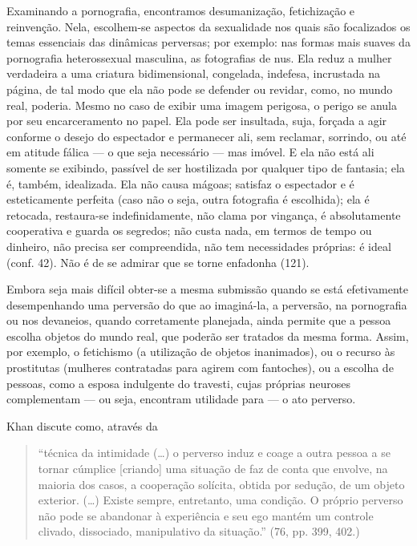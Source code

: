 Examinando a pornografia, encontramos desumanização,\idxpornodesu{} fetichização e
reinvenção. Nela, escolhem-se aspectos da sexualidade nos quais são
focalizados os temas essenciais das dinâmicas perversas; por exemplo:
nas formas mais suaves da pornografia heterossexual masculina, as
fotografias de nus. Ela reduz a mulher verdadeira a uma criatura
bidimensional, congelada, indefesa, incrustada na página, de tal modo
que ela não pode se defender ou revidar, como, no mundo real, poderia.
Mesmo no caso de exibir uma imagem perigosa, o perigo se anula por seu
encarceramento no papel. Ela pode ser insultada, suja, forçada a agir
conforme o desejo do espectador e permanecer ali, sem reclamar,
sorrindo, ou até em atitude fálica --- o que seja necessário --- mas
imóvel. E ela não está ali somente se exibindo, passível de ser
hostilizada por qualquer tipo de fantasia; ela é, também, idealizada.\idxpornoidea{}
Ela não causa mágoas; satisfaz o espectador e é esteticamente perfeita
(caso não o seja, outra fotografia é escolhida); ela é retocada,
restaura-se indefinidamente, não clama por vingança, é absolutamente
cooperativa e guarda os segredos; não custa nada, em termos de tempo ou
dinheiro, não precisa ser compreendida, não tem necessidades próprias:
é ideal (conf. 42). Não é de se admirar que se torne\idxpornoenfa{} enfadonha (121).

Embora seja mais difícil obter-se a mesma submissão quando se está
efetivamente desempenhando uma perversão do que ao imaginá-la, a
perversão, na pornografia ou nos devaneios, quando corretamente
planejada, ainda permite que a pessoa escolha objetos do mundo real,
que poderão ser tratados da mesma forma. Assim, por exemplo, o
fetichismo (a utilização de objetos inanimados), ou o recurso às
prostitutas\idxprost{} (mulheres contratadas para agirem com fantoches), ou a
escolha de pessoas, como a esposa\idxtravempape{} indulgente do travesti, cujas
próprias neuroses complementam --- ou seja, encontram utilidade para
--- o ato perverso.

Khan\idxkhan{} discute como, através da

\begin{quote}
  ``técnica\idxpervtecni{} da intimidade\idxintim{} (\ldots{}) o perverso induz e coage a
  outra pessoa a se tornar cúmplice [criando] uma situação de
  faz de conta que envolve, na maioria dos casos, a cooperação solícita,
  obtida por sedução, de um objeto exterior. (\ldots{}) Existe sempre,
  entretanto, uma condição. O próprio perverso não pode se abandonar à
  experiência e seu ego mantém um controle clivado, dissociado,
  manipulativo da situação.'' (76, pp. 399, 402.)
\end{quote}

